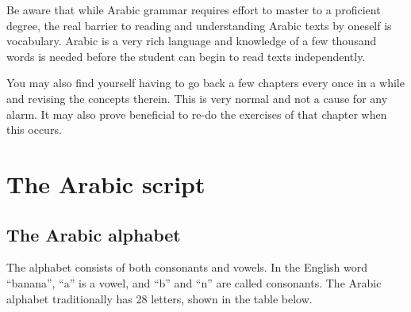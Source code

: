 \documentclass[
  10pt,
]{book}
\begin{document}
Be aware that while Arabic grammar requires effort to master to a proficient degree, the real barrier to reading and understanding Arabic texts by oneself is vocabulary. Arabic is a very rich language and knowledge of a few thousand words is needed before the student can begin to read texts independently.

You may also find yourself having to go back a few chapters every once in a while and revising the concepts therein. This is very normal and not a cause for any alarm. It may also prove beneficial to re-do the exercises of that chapter when this occurs.

\chapter{The Arabic script}\label{the-arabic-script}

\section{The Arabic alphabet}\label{the-arabic-alphabet}

The alphabet consists of both consonants and vowels. In the English word \enquote{banana}, \enquote{a} is a vowel, and \enquote{b} and \enquote{n} are called consonants.
The Arabic alphabet traditionally has 28 letters, shown in the table below.
\end{document}
